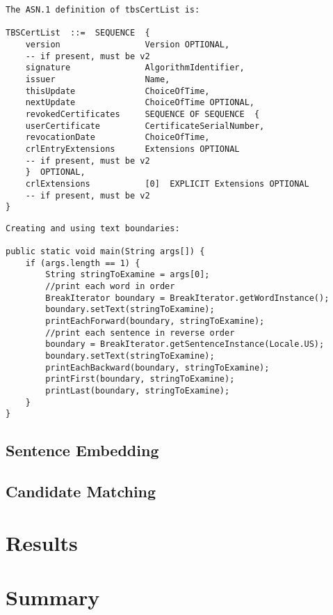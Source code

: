 \begin{lstlisting}[label=invalid-caveat-2,caption={An example of a caveat sentence extracted from the \lstinline{java.security.cert.X509CRL} documentation explaining the structure of a \lstinline{TBSCertList} object.},float,frame=tb,numbers=none,language=None]
The ASN.1 definition of tbsCertList is:

TBSCertList  ::=  SEQUENCE  {
	version                 Version OPTIONAL,
	-- if present, must be v2
	signature               AlgorithmIdentifier,
	issuer                  Name,
	thisUpdate              ChoiceOfTime,
	nextUpdate              ChoiceOfTime OPTIONAL,
	revokedCertificates     SEQUENCE OF SEQUENCE  {
	userCertificate         CertificateSerialNumber,
	revocationDate          ChoiceOfTime,
	crlEntryExtensions      Extensions OPTIONAL
	-- if present, must be v2
	}  OPTIONAL,
	crlExtensions           [0]  EXPLICIT Extensions OPTIONAL
	-- if present, must be v2
}
\end{lstlisting}

\begin{lstlisting}[label=invalid-caveat-3,caption={An example of a caveat sentence extracted from the \lstinline{java.text.BreakIterator} documentation that contains some sample code.},float,frame=tb,numbers=none,language=None]
Creating and using text boundaries:

public static void main(String args[]) {
	if (args.length == 1) {
		String stringToExamine = args[0];
		//print each word in order
		BreakIterator boundary = BreakIterator.getWordInstance();
		boundary.setText(stringToExamine);
		printEachForward(boundary, stringToExamine);
		//print each sentence in reverse order
		boundary = BreakIterator.getSentenceInstance(Locale.US);
		boundary.setText(stringToExamine);
		printEachBackward(boundary, stringToExamine);
		printFirst(boundary, stringToExamine);
		printLast(boundary, stringToExamine);
	}
}
\end{lstlisting}


\subsection{Sentence Embedding}
\label{subsec:info-sentence-embedding}

\subsection{Candidate Matching}
\label{subsec:info-candidate-match}

\section{Results}
\label{sec:info-results}


\section{Summary}

